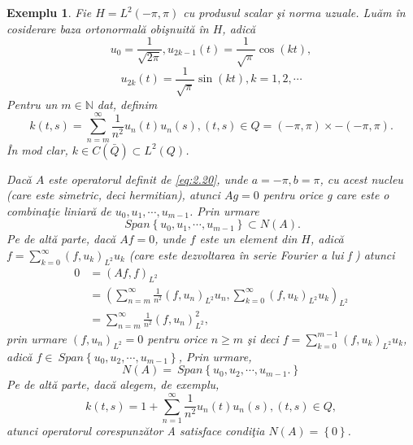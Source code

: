 \documentclass[a4paper,12pt,oneside]{report}
\newtheorem{example}{Exemplu}
\begin{document}
\begin{example}
Fie \(H = L^{2}\left ( -\pi ,\pi  \right )\) cu produsul scalar \c{s}i norma uzuale. Lu\u{a}m \^{i}n cosiderare baza ortonormal\u{a} obi\c{s}nuit\u{a} \^{i}n \(H\), adic\u{a}
\begin{displaymath}
u_{0} = \frac{1}{\sqrt{2\pi }}, u_{2k-1}\left ( t \right ) = \frac{1}{\sqrt{\pi }}\cos \left ( kt \right ),
\end{displaymath}
\begin{displaymath}
u_{2k}\left ( t \right ) = \frac{1}{\sqrt{\pi }}\sin\left ( kt \right ), k= 1,2,\cdots
\end{displaymath}
Pentru un \(m\in \mathbb{N}\) dat, definim
\begin{displaymath}
k\left ( t,s \right ) = \sum_{n=m}^{\infty }\frac{1}{n^{2}}u_{n}\left ( t \right )u_{n}\left ( s \right ), \left ( t,s \right )\in Q = \left ( -\pi ,\pi  \right )\times -\left ( -\pi ,\pi  \right ).
\end{displaymath}
\^{I}n mod clar, \(k\in C\left ( \bar{Q} \right )\subset L^{2}\left ( Q \right )\).

Dac\u{a} \(A\) este operatorul definit de \ref{eq:2.20}, unde \(a = -\pi, b = \pi\), cu acest nucleu (care este simetric, deci hermitian), atunci \(Ag=0\) pentru orice g care este o combina\c{t}ie liniar\u{a} de \(u_{0}, u_{1},\cdots,u_{m-1}\). Prin urmare
\begin{displaymath}
\ Span \left \{ u_{0}, u_{1},\cdots,u_{m-1} \right \} \subset N\left ( A \right ).
\end{displaymath}
Pe de alt\u{a} parte, dac\u{a} \(Af=0\), unde \(f\) este un element din \(H\), adic\u{a} \(f = \sum_{k=0}^{\infty }\left ( f,u_{k} \right )_{L^{2}}u_{k}\) (care este dezvoltarea \^{i}n serie Fourier a lui f ) atunci
\begin{equation} \nonumber
    \begin{split}
     0 &  =  \left ( Af,f \right )_{L^{2}}  \\ & = \left (\sum_{n=m}^{\infty }\frac{1}{n^{2}}\left ( f,u_{n} \right )_{L^{2}}u_{n}, \sum_{k=0}^{\infty }\left ( f,u_{k} \right )_{L^{2}}u_{k}  \right )_{L^{2}} \\ &  = \sum_{n=m}^{\infty }\frac{1}{n^{2}}\left ( f,u_{n} \right )_{L^{2}}^{2},
    \end{split}
\end{equation}
prin urmare \(\left ( f,u_{n} \right )_{L^{2}} = 0\) pentru orice \(n\geq m\) \c{s}i deci \(f = \sum_{k=0}^{m-1}\left ( f,u_{k} \right )_{L^{2}}u_{k}\), adic\u{a} \(f\in \ Span \left \{ u_{0}, u_{2},\cdots,u_{m-1} \right \}\), Prin urmare,
\begin{displaymath}
N\left ( A \right ) = \ Span \left \{ u_{0}, u_{2},\cdots,u_{m-1}. \right \}
\end{displaymath}
Pe de alt\u{a} parte, dac\u{a} alegem, de exemplu,
\begin{displaymath}
k\left ( t,s \right ) = 1+ \sum_{n=1}^{\infty }\frac{1}{n^{2}}u_{n}\left ( t \right )u_{n}\left ( s \right ), \left ( t,s \right )\in Q,
\end{displaymath}
atunci operatorul corespunz\u{a}tor A satisface condi\c{t}ia \(N\left ( A \right ) = \left \{ 0 \right \} \).
\end{example}
\end{document}
